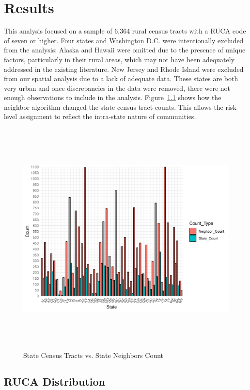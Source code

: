 \chapter{Results}	

This analysis focused on a sample of 6,364 rural census tracts with a RUCA code of seven or higher. Four states and Washington D.C. were intentionally excluded from the analysis: Alaska and Hawaii were omitted due to the presence of unique factors, particularly in their rural areas, which may not have been adequately addressed in the existing literature.  New Jersey and Rhode Island were excluded from our spatial analysis due to a lack of adequate data. These states are both very urban and once discrepancies in the data were removed, there were not enough observations to include in the analysis.  Figure~\ref{fig:neighbors_bar} 
shows how the neighbor algorithm changed the state census tract counts. This allows the risk-level assignment to reflect the intra-state nature of communities. 



\begin{figure}[htbp]
   \centering
    \includegraphics[width=1\textwidth, height=12cm]{plots/neighbors.png}
    \caption{State Census Tracts vs. State Neighbors Count}
    \label{fig:neighbors_bar}
\end{figure}

\section{RUCA Distribution}

